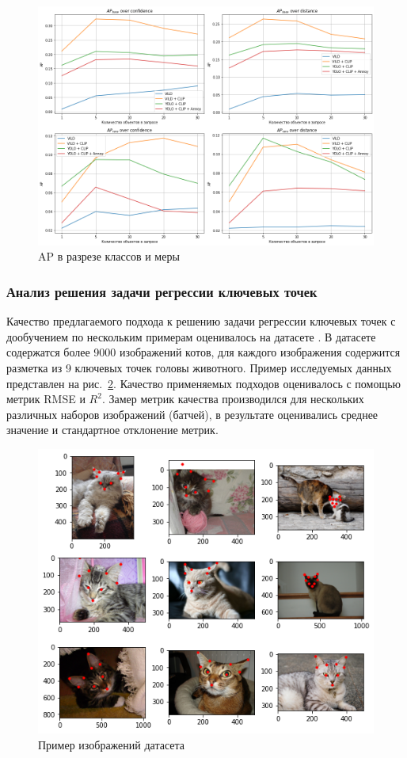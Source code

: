 \documentclass[a4paper,14pt]{article}
\begin{document}
    \begin{figure}[H]
        \centering
        \includegraphics[width=0.999\linewidth]{images/average_precision_metrics}
        \caption{AP в разрезе классов и меры}
        \label{fig:average_precision_metrics}
    \end{figure}

    \subsubsection{Анализ решения задачи регрессии ключевых точек} \label{kpoints_exp}

    Качество предлагаемого подхода к решению задачи регрессии ключевых точек с дообучением по нескольким примерам оценивалось на датасете \cite{cat_dataset}.
    В датасете содержатся более 9000 изображений котов, для каждого изображения содержится разметка из 9 ключевых точек головы животного.
    Пример исследуемых данных представлен на рис.~\ref{fig:example_cat_dataset}.
    Качество применяемых подходов оценивалось с помощью метрик RMSE и $R^2$.
    Замер метрик качества производился для нескольких различных наборов изображений (батчей), в результате оценивались среднее значение и стандартное отклонение метрик.

    \begin{figure}[H]
        \centering
        \includegraphics[width=0.6\linewidth]{images/example_cat_dataset}
        \caption{Пример изображений датасета \cite{cat_dataset}}
        \label{fig:example_cat_dataset}
    \end{figure}
\end{document}
